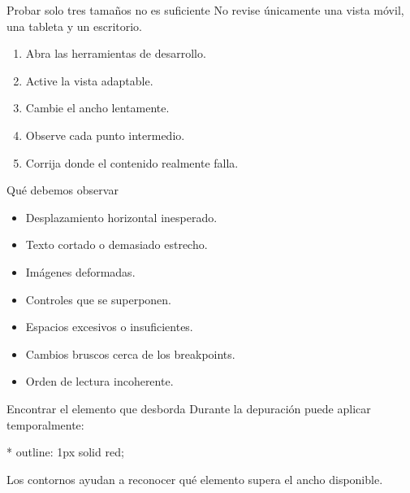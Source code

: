 \documentclass[aspectratio=169,11pt]{beamer}
\begin{document}
    \begin{frame}{Probar solo tres tamaños no es suficiente}
        No revise únicamente una vista móvil, una tableta y un escritorio.

        \begin{enumerate}
            \item Abra las herramientas de desarrollo.
            \item Active la vista adaptable.
            \item Cambie el ancho lentamente.
            \item Observe cada punto intermedio.
            \item Corrija donde el contenido realmente falla.
        \end{enumerate}

    \end{frame}

    \begin{frame}{Qué debemos observar}
        \begin{itemize}
            \item Desplazamiento horizontal inesperado.
            \item Texto cortado o demasiado estrecho.
            \item Imágenes deformadas.
            \item Controles que se superponen.
            \item Espacios excesivos o insuficientes.
            \item Cambios bruscos cerca de los breakpoints.
            \item Orden de lectura incoherente.
        \end{itemize}

    \end{frame}

    \begin{frame}[fragile]{Encontrar el elemento que desborda}
        Durante la depuración puede aplicar temporalmente:

        \begin{csscodedark}
            * {
                outline: 1px solid red;
            }
        \end{csscodedark}

        Los contornos ayudan a reconocer qué elemento supera el ancho disponible.

    \end{frame}
\end{document}
